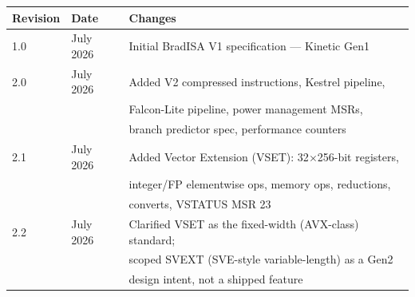 \documentclass[11pt,a4paper]{article}
\begin{document}
\begin{tabular}{lll}
\toprule
Revision & Date & Changes \\
\midrule
1.0 & July 2026 & Initial BradISA V1 specification --- Kinetic Gen1 \\
2.0 & July 2026 & Added V2 compressed instructions, Kestrel pipeline, \\
    &           & Falcon-Lite pipeline, power management MSRs, \\
    &           & branch predictor spec, performance counters \\
2.1 & July 2026 & Added Vector Extension (VSET): 32$\times$256-bit registers, \\
    &           & integer/FP elementwise ops, memory ops, reductions, \\
    &           & converts, VSTATUS MSR 23 \\
2.2 & July 2026 & Clarified VSET as the fixed-width (AVX-class) standard; \\
    &           & scoped SVEXT (SVE-style variable-length) as a Gen2 \\
    &           & design intent, not a shipped feature \\
\bottomrule
\end{tabular}
\end{document}
